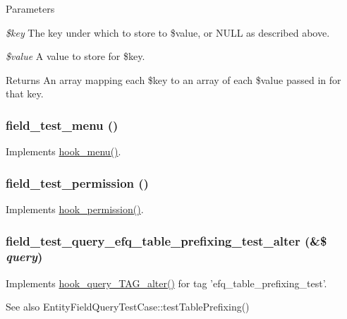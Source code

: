\begin{DoxyParams}{Parameters}
\item[{\em \$key}]The key under which to store to \$value, or NULL as described above. \item[{\em \$value}]A value to store for \$key. \end{DoxyParams}
\begin{DoxyReturn}{Returns}
An array mapping each \$key to an array of each \$value passed in for that key. 
\end{DoxyReturn}
\hypertarget{field__test_8module_aa880119cd376662b76b8106183cbc6a3}{
\subsubsection[{field\_\-test\_\-menu}]{\setlength{\rightskip}{0pt plus 5cm}field\_\-test\_\-menu ()}}
\label{field__test_8module_aa880119cd376662b76b8106183cbc6a3}
Implements \hyperlink{group__hooks_ga5c95244fea59b25666e409759e133ded}{hook\_\-menu()}. \hypertarget{field__test_8module_a503ace608465fba9f475e888bdad3877}{
\subsubsection[{field\_\-test\_\-permission}]{\setlength{\rightskip}{0pt plus 5cm}field\_\-test\_\-permission ()}}
\label{field__test_8module_a503ace608465fba9f475e888bdad3877}
Implements \hyperlink{group__hooks_ga2b22b45f4925f2478412477bae329713}{hook\_\-permission()}. \hypertarget{field__test_8module_afb32a3e4eb6fcc25c526997ccb48cba1}{
\subsubsection[{field\_\-test\_\-query\_\-efq\_\-table\_\-prefixing\_\-test\_\-alter}]{\setlength{\rightskip}{0pt plus 5cm}field\_\-test\_\-query\_\-efq\_\-table\_\-prefixing\_\-test\_\-alter (\&\$ {\em query})}}
\label{field__test_8module_afb32a3e4eb6fcc25c526997ccb48cba1}
Implements \hyperlink{group__hooks_ga12527037deeb76adcab1000e984fdfce}{hook\_\-query\_\-TAG\_\-alter()} for tag 'efq\_\-table\_\-prefixing\_\-test'.

\begin{DoxySeeAlso}{See also}
EntityFieldQueryTestCase::testTablePrefixing() 
\end{DoxySeeAlso}
